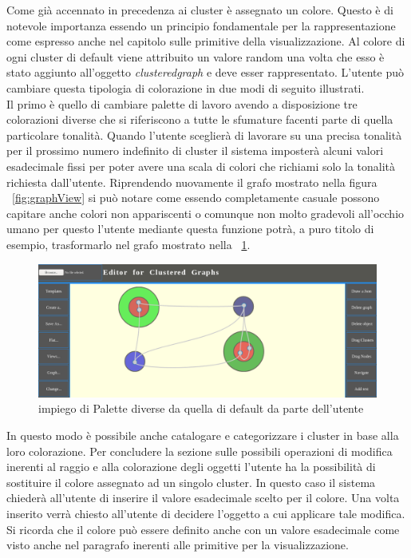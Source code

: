 {\begin{figure}[!htb]
\end{figure}
Come già accennato in precedenza ai cluster è assegnato un colore. Questo è di notevole importanza essendo un principio fondamentale per la rappresentazione come espresso anche nel capitolo sulle primitive della visualizzazione. Al colore di ogni cluster di default viene attribuito un valore random una volta che esso è stato aggiunto all'oggetto \textit{clusteredgraph} e deve esser rappresentato. L'utente può cambiare questa tipologia di colorazione in due modi di seguito illustrati.\\
Il primo è quello di cambiare palette di lavoro avendo a disposizione tre colorazioni diverse che si riferiscono a tutte le sfumature facenti parte di quella particolare tonalità. Quando l'utente sceglierà di lavorare su una precisa tonalità per il prossimo numero indefinito di cluster il sistema imposterà alcuni valori esadecimale fissi per poter avere una scala di colori che richiami solo la tonalità richiesta dall'utente. Riprendendo nuovamente il grafo mostrato nella figura \figurename~\ref{fig:graphView} si può notare come essendo completamente casuale possono capitare anche colori non appariscenti o comunque non molto gradevoli all'occhio umano per questo l'utente mediante questa funzione potrà, a puro titolo di esempio, trasformarlo nel grafo mostrato nella \figurename~\ref{fig:changePalette}.
\begin{figure}[!htb]
	\begin{center}
		\includegraphics[width=0.8 \linewidth]{figure/changePalette}
	\end{center}
	\caption{impiego di Palette diverse da quella di default da parte dell'utente\label{fig:changePalette}}
\end{figure}
In questo modo è possibile anche catalogare e categorizzare i cluster in base alla loro colorazione.
Per concludere la sezione sulle possibili operazioni di modifica inerenti al raggio e alla colorazione degli oggetti l'utente ha la possibilità di sostituire il colore assegnato ad un singolo cluster. In questo caso il sistema chiederà all'utente di inserire il valore esadecimale scelto per il colore. Una volta inserito verrà chiesto all'utente di decidere l'oggetto a cui applicare tale modifica. Si ricorda che il colore può essere definito anche con un valore esadecimale come visto anche nel paragrafo inerenti alle primitive per la visualizzazione.
}
